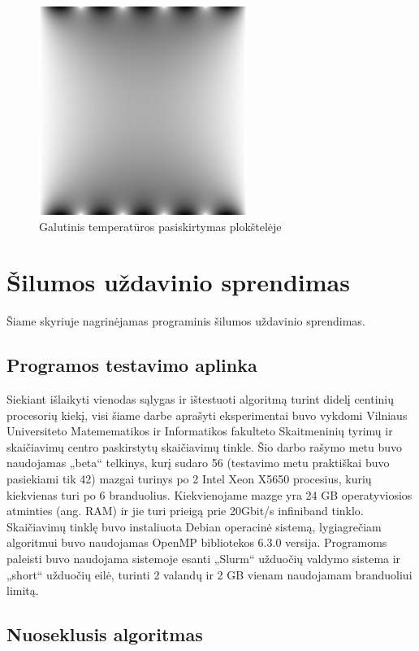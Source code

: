 \documentclass{VUMIFPSbakalaurinis}
\begin{document}
\begin{figure}[H]
    \centering
    \includegraphics[scale=0.7]{img/image_1000000.png}
    \caption{Galutinis temperatūros pasiskirtymas plokštelėje}
    \label{img:end}
\end{figure}

\section{Šilumos uždavinio sprendimas}

Šiame skyriuje nagrinėjamas programinis šilumos uždavinio sprendimas.


\subsection{Programos testavimo aplinka}

Siekiant išlaikyti vienodas sąlygas ir ištestuoti algoritmą turint didelį centinių procesorių kiekį, visi šiame darbe aprašyti eksperimentai buvo vykdomi Vilniaus Universiteto Matemematikos ir Informatikos fakulteto Skaitmeninių tyrimų ir skaičiavimų centro paskirstytų skaičiavimų tinkle.
Šio darbo rašymo metu buvo naudojamas „beta“ telkinys, kurį sudaro 56 (testavimo metu praktiškai buvo pasiekiami tik 42) mazgai turinys po 2 Intel Xeon X5650 procesius, kurių kiekvienas turi po 6 branduolius. 
Kiekvienojame mazge yra 24 GB operatyviosios atminties (ang. RAM) ir jie turi prieigą prie 20Gbit/s infiniband tinklo.
Skaičiavimų tinklę buvo instaliuota Debian operacinė sistemą, lygiagrečiam algoritmui buvo naudojamas OpenMP bibliotekos 6.3.0 versija.
Programoms paleisti buvo naudojama sistemoje esanti „Slurm“ užduočių valdymo sistema ir „short“ užduočių eilė, turinti 2 valandų ir 2 GB vienam naudojamam branduoliui limitą.

\subsection{Nuoseklusis algoritmas}
\end{document}
